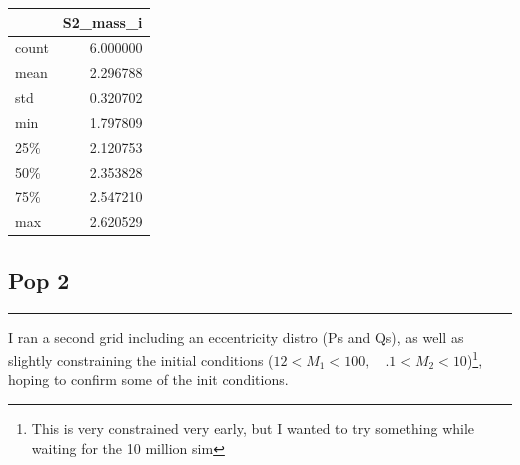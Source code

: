 \documentclass{article}
\theoremstyle{mytheoremstyle}
\theoremstyle{mytheoremstyle}
\theoremstyle{myproblemstyle}
\theoremstyle{myproblemstyle}
\newcounter{const}
\begin{document}
\begin{table}[H]
\begin{minipage}[t]{0.3\textwidth}
    \centering
    \begin{tabular}{|l|r|}
    \hline
    & S2\_mass\_i \\
    \hline
      count & 6.000000 \\
      mean & 2.296788 \\
      std & 0.320702 \\
      min & 1.797809 \\
      25\% & 2.120753 \\
      50\% & 2.353828 \\
      75\% & 2.547210 \\
      max & 2.620529 \\
    \hline
    \end{tabular}
  \end{minipage}

\end{table}

\subsection{{Pop 2}}
\hrule
\vspace{.5cm}
I ran a second grid including an eccentricity distro (Ps and Qs), as well as slightly constraining the initial conditions (\(12 < M_1 < 100, \quad .1 < M_2 < 10\))\footnote{This is very constrained very early, but I wanted to try something while waiting for the 10 million sim}, hoping to confirm some of the init conditions.
\end{document}
